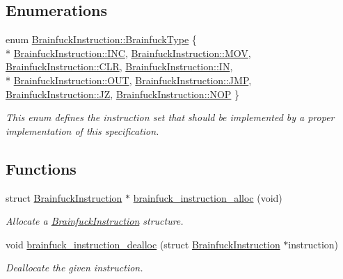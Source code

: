 \subsection*{Enumerations}
\begin{DoxyCompactItemize}
\item 
enum \hyperlink{group__ast_ga536105595916938ef76e66bb1cdf7b2b}{Brainfuck\+Instruction\+::\+Brainfuck\+Type} \{ \\*
\hyperlink{group__ast_gga536105595916938ef76e66bb1cdf7b2bad430fd56820303a90e73ceb42ee688c3}{Brainfuck\+Instruction\+::\+I\+N\+C}, 
\hyperlink{group__ast_gga536105595916938ef76e66bb1cdf7b2bac72dd0f54c974ce534e9b4416f4c8da6}{Brainfuck\+Instruction\+::\+M\+O\+V}, 
\hyperlink{group__ast_gga536105595916938ef76e66bb1cdf7b2bac1fb5c131100a52e04b9b2a0b000529d}{Brainfuck\+Instruction\+::\+C\+L\+R}, 
\hyperlink{group__ast_gga536105595916938ef76e66bb1cdf7b2baf95611cfc6305a83b391a18c19408d73}{Brainfuck\+Instruction\+::\+I\+N}, 
\\*
\hyperlink{group__ast_gga536105595916938ef76e66bb1cdf7b2bac2a4e58f27685769e6f5785073520725}{Brainfuck\+Instruction\+::\+O\+U\+T}, 
\hyperlink{group__ast_gga536105595916938ef76e66bb1cdf7b2ba5a4e446f0609b6e81c63cbaa2ad98e1d}{Brainfuck\+Instruction\+::\+J\+M\+P}, 
\hyperlink{group__ast_gga536105595916938ef76e66bb1cdf7b2ba46c8adfb23d44852d6e1a04d96cb1d66}{Brainfuck\+Instruction\+::\+J\+Z}, 
\hyperlink{group__ast_gga536105595916938ef76e66bb1cdf7b2ba02f03773b12443d2e4b834d140e5eb8f}{Brainfuck\+Instruction\+::\+N\+O\+P}
 \}
\begin{DoxyCompactList}\small\item\em This enum defines the instruction set that should be implemented by a proper implementation of this specification. \end{DoxyCompactList}\end{DoxyCompactItemize}
\subsection*{Functions}
\begin{DoxyCompactItemize}
\item 
struct \hyperlink{structBrainfuckInstruction}{Brainfuck\+Instruction} $\ast$ \hyperlink{group__ast_gab59880c464bbe2b086edc539b8b4a182}{brainfuck\+\_\+instruction\+\_\+alloc} (void)
\begin{DoxyCompactList}\small\item\em Allocate a \hyperlink{structBrainfuckInstruction}{Brainfuck\+Instruction} structure. \end{DoxyCompactList}\item 
void \hyperlink{group__ast_ga2028b09c7f2692fb7fe2cee732919b2d}{brainfuck\+\_\+instruction\+\_\+dealloc} (struct \hyperlink{structBrainfuckInstruction}{Brainfuck\+Instruction} $\ast$instruction)
\begin{DoxyCompactList}\small\item\em Deallocate the given instruction. \end{DoxyCompactList}\end{DoxyCompactItemize}


